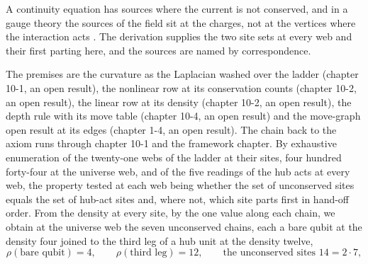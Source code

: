 \begin{chbridge}
A continuity equation has sources where the current is not conserved, and in a gauge theory the sources of the field sit at the charges, not at the vertices where the interaction acts \cite{Maxwell1865,Noether1918}. The derivation supplies the two site sets at every web and their first parting here, and the sources are named by correspondence.
\end{chbridge}
\begin{chproof}
The premises are the curvature as the Laplacian washed over the ladder (chapter 10-1, an open result), the nonlinear row at its conservation counts (chapter 10-2, an open result), the linear row at its density (chapter 10-2, an open result), the depth rule with its move table (chapter 10-4, an open result) and the move-graph open result at its edges (chapter 1-4, an open result). The chain back to the axiom runs through chapter 10-1 and the framework chapter. By exhaustive enumeration of the twenty-one webs of the ladder at their sites, four hundred forty-four at the universe web, and of the five readings of the hub acts at every web, the property tested at each web being whether the set of unconserved sites equals the set of hub-act sites and, where not, which site parts first in hand-off order. From the density at every site, by the one value along each chain, we obtain at the universe web the seven unconserved chains, each a bare qubit at the density four joined to the third leg of a hub unit at the density twelve,
\begin{equation}
\rho(\text{bare qubit}) = 4 , \qquad \rho(\text{third leg}) = 12 , \qquad \text{the unconserved sites } 14 = 2 \cdot 7 ,
\end{equation}

\end{chproof}
